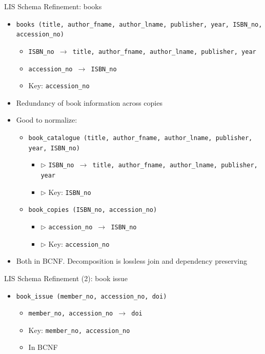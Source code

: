 \documentclass[aspectratio=169, xcolor=dvipsnames]{beamer}
\begin{document}
\begin{frame}{LIS Schema Refinement: books}
    \begin{itemize}
        \item \texttt{books (title, author\_fname, author\_lname, publisher, year, ISBN\_no, accession\_no)}
        \begin{itemize}
            \item \texttt{ISBN\_no $\rightarrow$ title, author\_fname, author\_lname, publisher, year}
            \item \texttt{accession\_no $\rightarrow$ ISBN\_no}
            \item Key: \texttt{accession\_no}
        \end{itemize}
        \item Redundancy of book information across copies
        \item Good to normalize:
        \begin{itemize}
            \item \texttt{book\_catalogue (title, author\_fname, author\_lname, publisher, year, ISBN\_no)}
            \begin{itemize}
                \item $\triangleright$ \texttt{ISBN\_no $\rightarrow$ title, author\_fname, author\_lname, publisher, year}
                \item $\triangleright$ Key: \texttt{ISBN\_no}
            \end{itemize}
            \item \texttt{book\_copies (ISBN\_no, accession\_no)}
            \begin{itemize}
                \item $\triangleright$ \texttt{accession\_no $\rightarrow$ ISBN\_no}
                \item $\triangleright$ Key: \texttt{accession\_no}
            \end{itemize}
        \end{itemize}
        \item Both in BCNF. Decomposition is lossless join and dependency preserving
    \end{itemize}
\end{frame}

\begin{frame}{LIS Schema Refinement (2): book issue}
    \begin{itemize}
        \item \texttt{book\_issue (member\_no, accession\_no, doi)}
        \begin{itemize}
            \item \texttt{member\_no, accession\_no $\rightarrow$ doi}
            \item Key: \texttt{member\_no, accession\_no}
            \item In BCNF
        \end{itemize}
    \end{itemize}
\end{frame}
\end{document}
